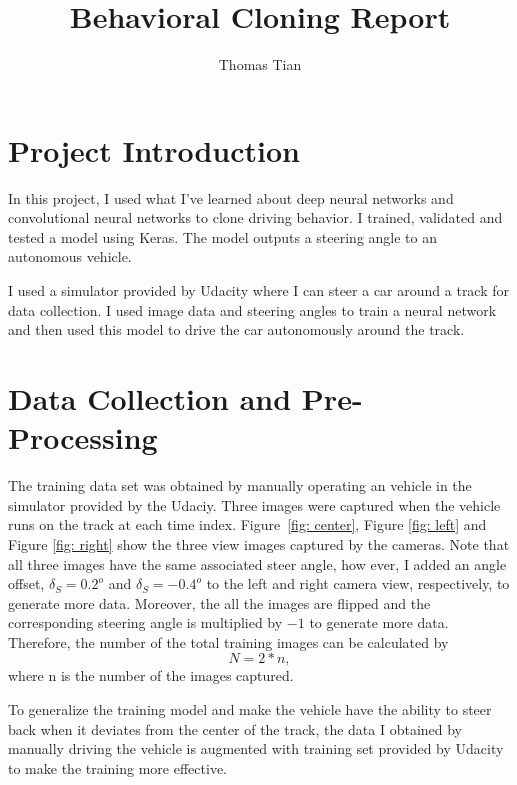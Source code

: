 \documentclass{article}
\begin{document}
\pagestyle{fancyplain}


\title{\textbf{Behavioral Cloning Report}}
\author{Thomas Tian}

\maketitle


\section{Project Introduction}

In this project, I used what I've learned about deep neural networks and convolutional neural networks to clone driving behavior. I trained, validated and tested a model using Keras. The model outputs a steering angle to an autonomous vehicle.

I used a simulator provided by Udacity where I can steer a car around a track for data collection. I used image data and steering angles to train a neural network and then used this model to drive the car autonomously around the track.

\section{Data Collection and Pre-Processing}

The training data set was obtained by manually operating an vehicle in the simulator provided by the Udaciy. Three images were captured when the vehicle runs on the track at each time index. Figure~\ref{fig: center}, Figure \ref{fig: left} and Figure \ref{fig: right} show the three view images captured by the cameras. Note that all three images have the same associated steer angle, how ever, I added an angle offset, $\delta_S = 0.2 ^o$ and $\delta_S = -0.4 ^o$ to the left and right camera view, respectively, to generate more data. Moreover, the all the images are flipped and the corresponding steering angle is multiplied by $-1$ to generate more data. Therefore, the number of the total training images can be calculated by
\begin{equation}
N = 2*n,
\end{equation}   
where n is the number of the images captured. 

To generalize the training model and make the vehicle have the ability to steer back when it deviates from the center of the track, the data I obtained by manually driving the vehicle is augmented with training set provided by Udacity to make the training more effective. 
\end{document}
